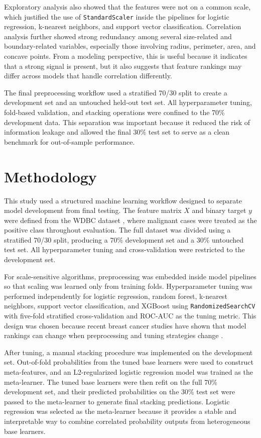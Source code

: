 \documentclass[conference]{IEEEtran}
\begin{document}
Exploratory analysis also showed that the features were not on a common scale, which justified the use of \texttt{StandardScaler} inside the pipelines for logistic regression, k-nearest neighbors, and support vector classification. Correlation analysis further showed strong redundancy among several size-related and boundary-related variables, especially those involving radius, perimeter, area, and concave points. From a modeling perspective, this is useful because it indicates that a strong signal is present, but it also suggests that feature rankings may differ across models that handle correlation differently.

The final preprocessing workflow used a stratified 70/30 split to create a development set and an untouched held-out test set. All hyperparameter tuning, fold-based validation, and stacking operations were confined to the 70\% development data. This separation was important because it reduced the risk of information leakage and allowed the final 30\% test set to serve as a clean benchmark for out-of-sample performance.

\section{Methodology}
This study used a structured machine learning workflow designed to separate model development from final testing. The feature matrix $X$ and binary target $y$ were defined from the WDBC dataset \cite{b8}, where malignant cases were treated as the positive class throughout evaluation. The full dataset was divided using a stratified 70/30 split, producing a 70\% development set and a 30\% untouched test set. All hyperparameter tuning and cross-validation were restricted to the development set.

For scale-sensitive algorithms, preprocessing was embedded inside model pipelines so that scaling was learned only from training folds. Hyperparameter tuning was performed independently for logistic regression, random forest, k-nearest neighbors, support vector classification, and XGBoost using \texttt{RandomizedSearchCV} with five-fold stratified cross-validation and ROC-AUC as the tuning metric. This design was chosen because recent breast cancer studies have shown that model rankings can change when preprocessing and tuning strategies change \cite{b6,b9,b12,b13}.

After tuning, a manual stacking procedure was implemented on the development set. Out-of-fold probabilities from the tuned base learners were used to construct meta-features, and an L2-regularized logistic regression model was trained as the meta-learner. The tuned base learners were then refit on the full 70\% development set, and their predicted probabilities on the 30\% test set were passed to the meta-learner to generate final stacking predictions. Logistic regression was selected as the meta-learner because it provides a stable and interpretable way to combine correlated probability outputs from heterogeneous base learners.
\end{document}
